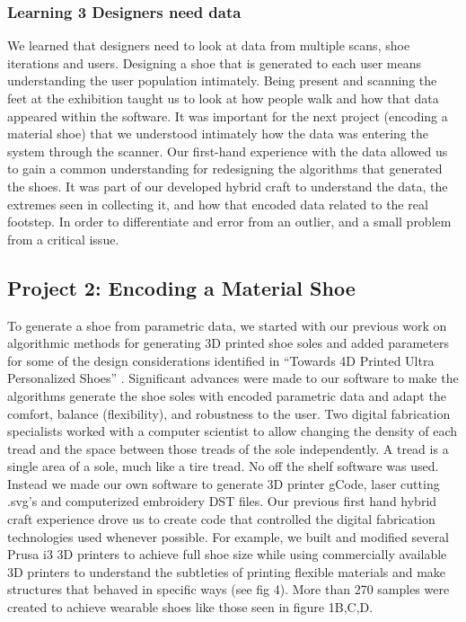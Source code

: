 \subsubsection{Learning 3 Designers need data}

We learned that designers need to look at data from multiple scans, shoe iterations and users. Designing a shoe that is generated to each user means understanding the user population intimately. Being present and scanning the feet at the exhibition taught us to look at how people walk and how that data appeared within the software. It was important for the next project (encoding a material shoe) that we understood intimately how the data was entering the system through the scanner. Our first-hand experience with the data allowed us to gain a common understanding for redesigning the algorithms that generated the shoes. It was part of our developed hybrid craft to understand the data, the extremes seen in collecting it, and how that encoded data related to the real footstep. In order to differentiate and error from an outlier, and a small problem from a critical issue. 

\subsection{Project 2: Encoding a Material Shoe}

To generate a shoe from parametric data, we started with our previous work on algorithmic methods for generating 3D printed shoe soles \cite{Feijs2016} and added parameters for some of the design considerations identified in ``Towards 4D Printed Ultra Personalized Shoes'' \cite{nachtigall2018towards}. Significant advances were made to our software \cite{Feijs2015} to make the algorithms generate the shoe soles with encoded parametric data and adapt the comfort, balance (flexibility), and robustness to the user. Two digital fabrication specialists worked with a computer scientist to allow changing the density of each  tread and the space between those treads of the sole independently. A tread is a single area of a sole, much like a tire tread.
No off the shelf software was used. Instead we made our own software to generate 3D printer gCode, laser cutting .svg's and computerized embroidery DST files. Our previous first hand hybrid craft experience drove us to create code \cite{Feijs2016} that controlled the digital fabrication technologies used whenever possible. For example, we built and modified several Prusa i3 3D printers to achieve full shoe size while using commercially available 3D printers to understand the subtleties of printing flexible materials and make structures that behaved in specific ways (see fig 4). More than 270 samples were created to achieve wearable shoes like those seen in figure 1B,C,D. 


